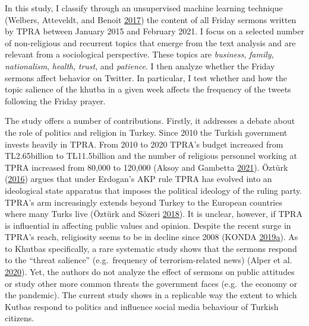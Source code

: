 \documentclass[
  12pt,
]{article}
\begin{document}
In this study, I classify through an unsupervised machine learning technique (Welbers, Atteveldt, and Benoit \protect\hyperlink{ref-WVB17}{2017}) the content of all Friday sermons written by TPRA between January 2015 and February 2021. I focus on a selected number of non-religious and recurrent topics that emerge from the text analysis and are relevant from a sociological perspective. These topics are \emph{business}, \emph{family}, \emph{nationalism}, \emph{health}, \emph{trust}, and \emph{patience}. I then analyze whether the Friday sermons affect behavior on Twitter. In particular, I test whether and how the topic salience of the khutba in a given week affects the frequency of the tweets following the Friday prayer.

The study offers a number of contributions. Firstly, it addresses a debate about the role of politics and religion in Turkey. Since 2010 the Turkish government invests heavily in TPRA. From 2010 to 2020 TPRA's budget increased from TL2.65billion to TL11.5billion and the number of religious personnel working at TPRA increased from 80,000 to 120,000 (Aksoy and Gambetta \protect\hyperlink{ref-AG21}{2021}). Öztürk (\protect\hyperlink{ref-Ozt16}{2016}) argues that under Erdogan's AKP rule TPRA has evolved into an ideological state apparatus that imposes the political ideology of the ruling party. TPRA's arm increasingly extends beyond Turkey to the European countries where many Turks live (Öztürk and Sözeri \protect\hyperlink{ref-uxf6ztuxfcrk_suxf6zeri_2018}{2018}). It is unclear, however, if TPRA is influential in affecting public values and opinion. Despite the recent surge in TPRA's reach, religiosity seems to be in decline since 2008 (KONDA \protect\hyperlink{ref-Kon19}{2019}\protect\hyperlink{ref-Kon19}{a}). As to Khutbas specifically, a rare systematic study shows that the sermons respond to the ``threat salience'' (e.g.~frequency of terrorism-related news) (Alper et al. \protect\hyperlink{ref-alper2020changes}{2020}). Yet, the authors do not analyze the effect of sermons on public attitudes or study other more common threats the government faces (e.g.~the economy or the pandemic). The current study shows in a replicable way the extent to which Kutbas respond to politics and influence social media behaviour of Turkish citizens.
\end{document}
